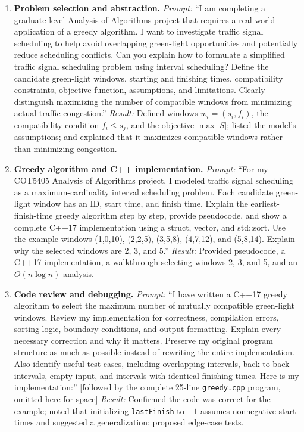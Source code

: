 \begin{enumerate}

\item \textbf{Problem selection and abstraction.}
\emph{Prompt:} ``I am completing a graduate-level
Analysis of Algorithms project that requires a
real-world application of a greedy algorithm. I want
to investigate traffic signal scheduling to help avoid
overlapping green-light opportunities and potentially
reduce scheduling conflicts. Can you explain how to
formulate a simplified traffic signal scheduling
problem using interval scheduling? Define the candidate
green-light windows, starting and finishing times,
compatibility constraints, objective function,
assumptions, and limitations. Clearly distinguish
maximizing the number of compatible windows from
minimizing actual traffic congestion.''
\emph{Result:} Defined windows $w_i=(s_i,f_i)$, the
compatibility condition $f_i \le s_j$, and the
objective $\max|S|$; listed the model's assumptions;
and explained that it maximizes compatible windows
rather than minimizing congestion.

\item \textbf{Greedy algorithm and C++ implementation.}
\emph{Prompt:} ``For my COT5405 Analysis of Algorithms
project, I modeled traffic signal scheduling as a
maximum-cardinality interval scheduling problem. Each
candidate green-light window has an ID, start time, and
finish time. Explain the earliest-finish-time greedy
algorithm step by step, provide pseudocode, and show a
complete C++17 implementation using a struct, vector,
and std::sort. Use the example windows (1,0,10),
(2,2,5), (3,5,8), (4,7,12), and (5,8,14). Explain why
the selected windows are 2, 3, and 5.''
\emph{Result:} Provided pseudocode, a C++17
implementation, a walkthrough selecting windows 2, 3,
and 5, and an $O(n\log n)$ analysis.

\item \textbf{Code review and debugging.}
\emph{Prompt:} ``I have written a C++17 greedy algorithm
to select the maximum number of mutually compatible
green-light windows. Review my implementation for
correctness, compilation errors, sorting logic,
boundary conditions, and output formatting. Explain
every necessary correction and why it matters. Preserve
my original program structure as much as possible
instead of rewriting the entire implementation. Also
identify useful test cases, including overlapping
intervals, back-to-back intervals, empty input, and
intervals with identical finishing times. Here is my
implementation:'' [followed by the complete 25-line
\texttt{greedy.cpp} program, omitted here for space]
\emph{Result:} Confirmed the code was correct for the
example; noted that initializing \texttt{lastFinish} to
$-1$ assumes nonnegative start times and suggested a
generalization; proposed edge-case tests.


\end{enumerate}
